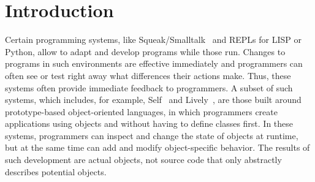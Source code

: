 
\chapter{Introduction} \label{chapter:INTRODUCTION}

Certain programming systems, like Squeak/Smalltalk~\cite{GoldbergRobson83} and REPLs for LISP or Python, allow to adapt and develop programs while those run.
Changes to programs in such environments are effective immediately and programmers can often see or test right away what differences their actions make.
Thus, these systems often provide immediate feedback to programmers.
A subset of such systems, which includes, for example, Self~\cite{Ungar1987SPS,Ungar2007SEL} and Lively~\cite{Ingalls2008LKS,Krahn2009LWD}, are those built around prototype-based object-oriented languages, in which programmers create applications using objects and without having to define classes first.
In these systems, programmers can inspect and change the state of objects at runtime, but at the same time can add and modify object-specific behavior.
The results of such development are actual objects, not source code that only abstractly describes potential objects.


